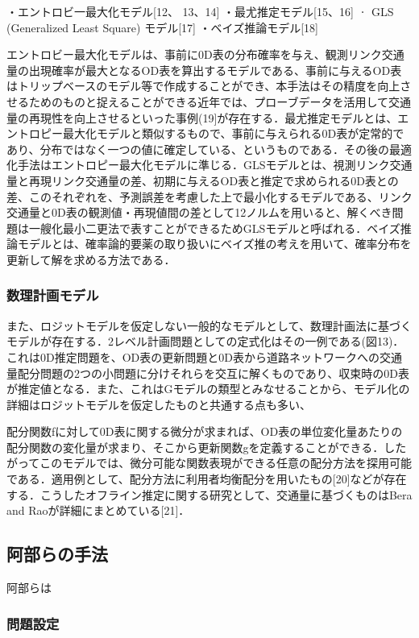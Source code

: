 ・エントロビ一最大化モデル[12、 13、14]
・最尤推定モデル[15、16]
ㆍ GLS (Generalized Least Square) モデル[17]
・ベイズ推論モデル[18]

エントロビー最大化モデルは、事前に0D表の分布確率を与え、観測リンク交通量の出現確率が最大となるOD表を算出するモデルである、事前に与えるOD表はトリップベースのモデル等で作成することができ、本手法はその精度を向上させるためのものと捉えることができる近年では、プローブデータを活用して交通量の再現性を向上させるといった事例(19]が存在する．最尤推定モデルとは、エントロピー最大化モデルと類似するもので、事前に与えられる0D表が定常的であり、分布ではなく一つの値に確定している、というものである．その後の最適化手法はエントロピー最大化モデルに準じる．GLSモデルとは、視測リンク交通量と再現リンク交通量の差、初期に与えるOD表と推定で求められる0D表との差、このそれぞれを、予測誤差を考慮した上で最小化するモデルである、リンク交通量と0D表の観測値・再現値間の差として12ノルムを用いると、解くべき間題は一艘化最小二更法で表すことができるためGLSモデルと呼ばれる．ベイズ推論モデルとは、確率論的要薬の取り扱いにベイズ推の考えを用いて、確率分布を更新して解を求める方法である．

\subsubsection{数理計画モデル}

また、ロジットモデルを仮定しない一般的なモデルとして、数理計画法に基づくモデルが存在する．2レベル計画問題としての定式化はその一例である(図13)．これは0D推定問題を、OD表の更新問題と0D表から道路ネットワークへの交通量配分問題の2つの小問題に分けそれらを交互に解くものであり、収束時の0D表が推定値となる．また、これはGモデルの類型とみなせることから、モデル化の詳細はロジットモデルを仮定したものと共通する点も多い、

配分関数fに対して0D表に関する微分が求まれば、OD表の単位変化量あたりの配分関数の変化量が求まり、そこから更新関数gを定義することができる．したがってこのモデルでは、微分可能な関数表現ができる任意の配分方法を探用可能である．適用例として、配分方法に利用者均衡配分を用いたもの[20]などが存在する．こうしたオフライン推定に関する研究として、交通量に基づくものはBera and Raoが詳細にまとめている[21]．

\subsection{阿部らの手法}

阿部らは

\subsubsection{問題設定}

